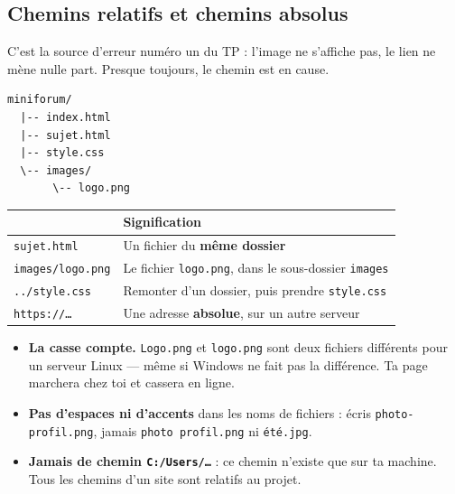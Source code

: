 \documentclass[a4paper,11pt]{article}
\newcommand{\hdr}[1]{\multicolumn{1}{l}{\color{white}\bfseries #1}}
\renewcommand{\arraystretch}{1.3}
\begin{document}
\subsection{Chemins relatifs et chemins absolus}

C'est la source d'erreur numéro un du TP : l'image ne s'affiche pas, le lien ne mène nulle part. Presque toujours, le chemin est en cause.

\begin{lstlisting}[caption={Arborescence du projet MiniForum}]
miniforum/
  |-- index.html
  |-- sujet.html
  |-- style.css
  \-- images/
       \-- logo.png
\end{lstlisting}

\begin{center}
\renewcommand{\arraystretch}{1.0}
\begin{tabularx}{\linewidth}{p{4.2cm}X}
  \toprule
  \rowcolor{uniNavy}
  \hdr{Écriture} & \hdr{Signification} \\
  \midrule
  \rowcolor{uniPaper}
  \texttt{sujet.html} & Un fichier du \textbf{même dossier} \\
  \texttt{images/logo.png} & Le fichier \texttt{logo.png}, dans le sous-dossier \texttt{images} \\
  \rowcolor{uniPaper}
  \texttt{../style.css} & Remonter d'un dossier, puis prendre \texttt{style.css} \\
  \texttt{https://\dots} & Une adresse \textbf{absolue}, sur un autre serveur \\
  \bottomrule
\end{tabularx}
\end{center}

\begin{tcolorbox}[attention, title={Trois pièges classiques}]
\begin{itemize}
  \item \textbf{La casse compte.} \texttt{Logo.png} et \texttt{logo.png} sont deux fichiers différents pour un serveur Linux --- même si Windows ne fait pas la différence. Ta page marchera chez toi et cassera en ligne.
  \item \textbf{Pas d'espaces ni d'accents} dans les noms de fichiers : écris \texttt{photo-profil.png}, jamais \texttt{photo profil.png} ni \texttt{été.jpg}.
  \item \textbf{Jamais de chemin \texttt{C:/Users/\dots}} : ce chemin n'existe que sur ta machine. Tous les chemins d'un site sont relatifs au projet.
\end{itemize}
\end{tcolorbox}
\end{document}
